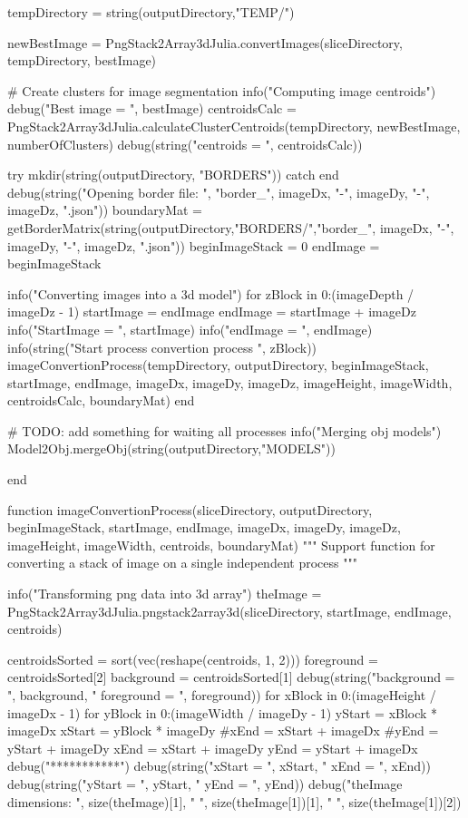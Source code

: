 \documentclass[11pt,oneside]{article}	%
\begin{document}
{  tempDirectory = string(outputDirectory,"TEMP/")

  newBestImage = PngStack2Array3dJulia.convertImages(sliceDirectory, tempDirectory, bestImage)

  # Create clusters for image segmentation
  info("Computing image centroids")
  debug("Best image = ", bestImage)
  centroidsCalc = PngStack2Array3dJulia.calculateClusterCentroids(tempDirectory, newBestImage, numberOfClusters)
  debug(string("centroids = ", centroidsCalc))

  try
    mkdir(string(outputDirectory, "BORDERS"))
  catch
  end
  debug(string("Opening border file: ", "border_", imageDx, "-", imageDy, "-", imageDz, ".json"))
  boundaryMat = getBorderMatrix(string(outputDirectory,"BORDERS/","border_", imageDx, "-",
                                       imageDy, "-", imageDz, ".json"))
  beginImageStack = 0
  endImage = beginImageStack

  info("Converting images into a 3d model")
  for zBlock in 0:(imageDepth / imageDz - 1)
    startImage = endImage
    endImage = startImage + imageDz
    info("StartImage = ", startImage)
    info("endImage = ", endImage)
    info(string("Start process convertion process ", zBlock))
    imageConvertionProcess(tempDirectory, outputDirectory,
                           beginImageStack, startImage, endImage,
                           imageDx, imageDy, imageDz,
                           imageHeight, imageWidth,
                           centroidsCalc, boundaryMat)
  end

  # TODO: add something for waiting all processes
  info("Merging obj models")
  Model2Obj.mergeObj(string(outputDirectory,"MODELS"))

end

function imageConvertionProcess(sliceDirectory, outputDirectory,
                                beginImageStack, startImage, endImage,
                                imageDx, imageDy, imageDz,
                                imageHeight, imageWidth,
                                centroids, boundaryMat)
  """
  Support function for converting a stack of image on a single
  independent process
  """

  info("Transforming png data into 3d array")
  theImage = PngStack2Array3dJulia.pngstack2array3d(sliceDirectory, startImage, endImage, centroids)

  centroidsSorted = sort(vec(reshape(centroids, 1, 2)))
  foreground = centroidsSorted[2]
  background = centroidsSorted[1]
  debug(string("background = ", background, " foreground = ", foreground))
  for xBlock in 0:(imageHeight / imageDx - 1)
    for yBlock in 0:(imageWidth / imageDy - 1)
      yStart = xBlock * imageDx
      xStart = yBlock * imageDy
      #xEnd = xStart + imageDx
      #yEnd = yStart + imageDy
      xEnd = xStart + imageDy
      yEnd = yStart + imageDx
      debug("***********")
      debug(string("xStart = ", xStart, " xEnd = ", xEnd))
      debug(string("yStart = ", yStart, " yEnd = ", yEnd))
      debug("theImage dimensions: ", size(theImage)[1], " ", size(theImage[1])[1], " ", size(theImage[1])[2])

}
\end{document}
